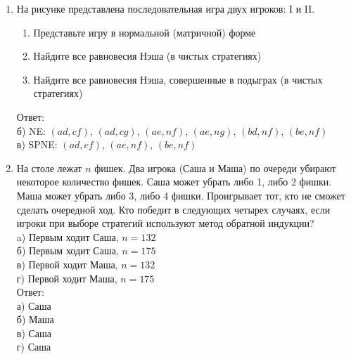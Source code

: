 \documentclass[pdftex,12pt,a4paper]{article}
\begin{document}
\begin{enumerate}
\item На рисунке представлена последовательная игра двух игроков: I и II. \\

\begin{enumerate}
\item Представьте игру в нормальной (матричной) форме 
\item Найдите все равновесия Нэша (в чистых стратегиях)
\item Найдите все равновесия Нэша, совершенные в подыграх (в чистых стратегиях) 
\end{enumerate}
Ответ: \\
б) NE: $(ad,cf)$, $(ad,cg)$, $(ae,nf)$, $(ae,ng)$, $(bd,nf)$, $(be,nf)$ \\
в) SPNE: $(ad,cf)$, $(ae,nf)$, $(be,nf)$ 

\item	На столе лежат $n$ фишек. Два игрока (Саша и Маша) по очереди убирают некоторое количество фишек. Саша может убрать либо 1, либо 2 фишки. Маша может убрать либо 3, либо 4 фишки. Проигрывает тот, кто не сможет сделать очередной ход. Кто победит в следующих четырех случаях, если игроки при выборе стратегий используют метод обратной индукции? \\
a) Первым ходит Саша, $n=132$  \\
б) Первым ходит Саша, $n=175$  \\
в) Первой ходит Маша, $n=132$  \\
г) Первой ходит Маша, $n=175$  \\
Ответ: \\
а) Саша \\
б) Маша \\
в) Саша \\
г) Саша \\
\end{enumerate}
\end{document}

